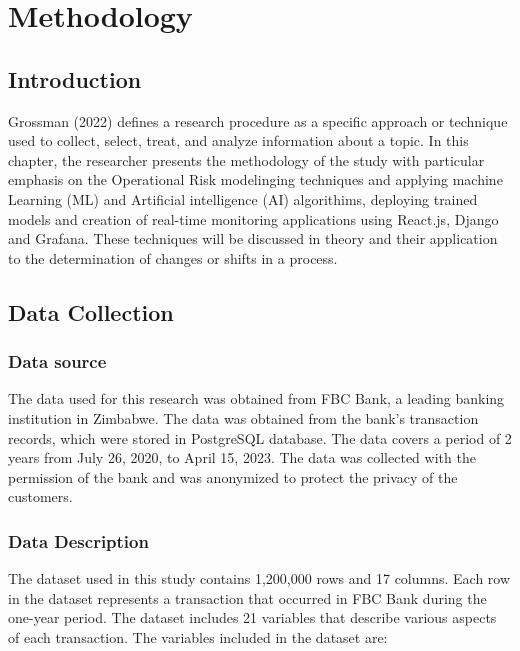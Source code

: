 \chapter{Methodology}

\section{Introduction}
Grossman (2022) defines a research procedure as a specific approach or technique used to collect, select, treat, 
and analyze information about a topic. In this chapter, the researcher presents the methodology of the study with 
particular emphasis on the Operational Risk modelinging techniques and applying machine Learning (ML)
and Artificial intelligence (AI) algorithims, deploying trained models and creation of real-time monitoring
applications using React.js, Django and Grafana. These techniques
will be discussed in theory and their application to the determination of
changes or shifts in a process.

\section{Data Collection}

\subsection{Data source}
The data used for this research was obtained from FBC Bank, a leading banking institution in Zimbabwe. 
The data was obtained from the bank's transaction records, which were stored in PostgreSQL database. The data 
covers a period of 2 years from July 26, 2020, to April 15, 2023. The data was collected with the 
permission of the bank and was anonymized to protect the privacy of the customers.

\subsection{Data Description}
The dataset used in this study contains 1,200,000 rows and 17 columns. Each row in the dataset represents a 
transaction that occurred in FBC Bank during the one-year period. The dataset includes 21 variables that describe 
various aspects of each transaction. The variables included in the dataset are:

